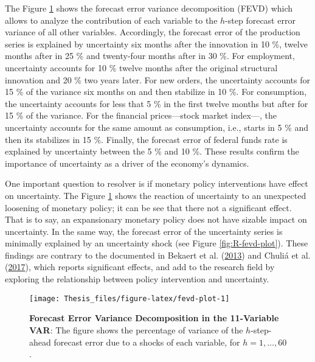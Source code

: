 \documentclass[12pt,twoside]{reedthesis}
\begin{document}
The Figure \ref{fig:fevd-plot} shows the forecast error variance decomposition (FEVD) which allows to analyze the contribution of each variable to the \(h\)-step forecast error variance of all other variables. Accordingly, the forecast error of the production series is explained by uncertainty six months after the innovation in 10 \%, twelve months after in 25 \% and twenty-four months after in 30 \%. For employment, uncertainty accounts for 10 \% twelve months after the original structural innovation and 20 \% two years later. For new orders, the uncertainty accounts for 15 \% of the variance six months on and then stabilize in 10 \%. For consumption, the uncertainty accounts for less that 5 \% in the first twelve months but after for 15 \% of the variance. For the financial prices---stock market index---, the uncertainty accounts for the same amount as consumption, i.e., starts in 5 \% and then its stabilizes in 15 \%. Finally, the forecast error of federal funds rate is explained by uncertainty between the 5 \% and 10 \%. These results confirm the importance of uncertainty as a driver of the economy's dynamics.

One important question to resolver is if monetary policy interventions have effect on uncertainty. The Figure \ref{fig:fevd-plot} shows the reaction of uncertainty to an unexpected loosening of monetary policy; it can be see that there not a significant effect. That is to say, an expansionary monetary policy does not have sizable impact on uncertainty. In the same way, the forecast error of the uncertainty series is minimally explained by an uncertainty shock (see Figure \ref{fig:R-fevd-plot}). These findings are contrary to the documented in Bekaert et al. (\protect\hyperlink{ref-bekaetal:2013}{2013}) and Chuliá et al. (\protect\hyperlink{ref-chuletal:2017}{2017}), which reports significant effects, and add to the research field by exploring the relationship between policy intervention and uncertainty.


\begin{figure}

{\centering \texttt{[image: Thesis\_files/figure-latex/fevd-plot-1]} 

}

\caption[Forecast Error Variance Decomposition in the 11-Variable VAR]{\textbf{Forecast Error Variance Decomposition in the 11-Variable VAR}: The figure shows the percentage of variance of the \(h\)-step-ahead forecast error due to a shocks of each variable, for \(h = 1, \ldots, 60\).}\label{fig:fevd-plot}
\end{figure}
\end{document}
